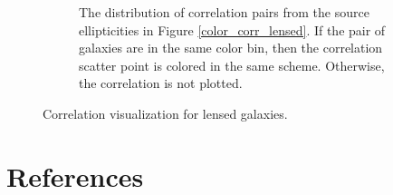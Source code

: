 \documentclass[%
 reprint,
 amsmath,amssymb,
 aps,nofootinbib
]{revtex4-1}
\begin{document}
\begin{figure}
\begin{subfigure}{0.44\textwidth}
        \captionsetup{justification=raggedright,singlelinecheck=false}
        \caption{The distribution of correlation pairs from the source ellipticities in Figure \ref{color_corr_lensed}. If the pair of galaxies are in the same color bin, then the correlation scatter point is colored in the same scheme. Otherwise, the correlation is not plotted.}
        \label{corr_dist_lensed}
    \end{subfigure}
    \caption{Correlation visualization for lensed galaxies.}
    \label{colored_corr_lensed}
\end{figure}

\section{References}
\vspace{-.35in}


\end{document}
